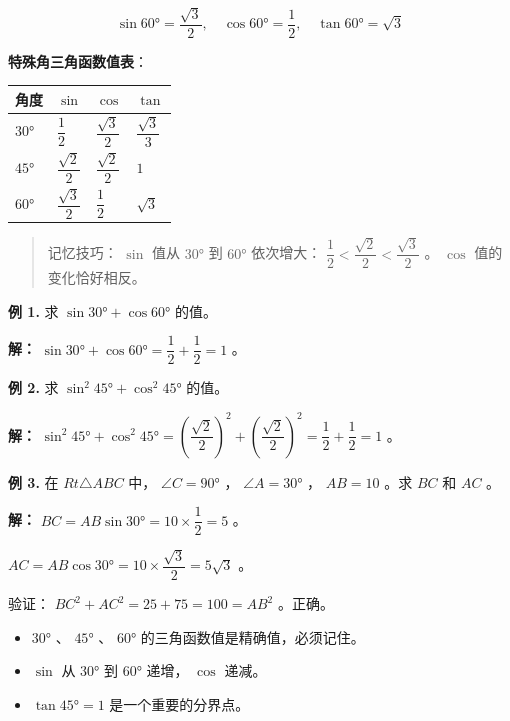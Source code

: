\begin{understand}
\[
\sin 60° = \frac{\sqrt{3}}{2}, \quad \cos 60° = \frac{1}{2}, \quad \tan 60° = \sqrt{3}
\]


\textbf{特殊角三角函数值表}：

\begin{center}
\begin{tabular}{llll}
\toprule
角度 & $\sin$ & $\cos$ & $\tan$ \\
\midrule
$30°$ & $\dfrac{1}{2}$ & $\dfrac{\sqrt{3}}{2}$ & $\dfrac{\sqrt{3}}{3}$ \\
$45°$ & $\dfrac{\sqrt{2}}{2}$ & $\dfrac{\sqrt{2}}{2}$ & $1$ \\
$60°$ & $\dfrac{\sqrt{3}}{2}$ & $\dfrac{1}{2}$ & $\sqrt{3}$ \\
\bottomrule
\end{tabular}
\end{center}


\end{understand}

\begin{quote}
记忆技巧： $\sin$ 值从 $30°$ 到 $60°$ 依次增大： $\dfrac{1}{2} < \dfrac{\sqrt{2}}{2} < \dfrac{\sqrt{3}}{2}$ 。 $\cos$ 值的变化恰好相反。
\end{quote}


\begin{workedexamples}


\textbf{例 1.} 求 $\sin 30° + \cos 60°$ 的值。

\textbf{解：}
$\sin 30° + \cos 60° = \dfrac{1}{2} + \dfrac{1}{2} = 1$ 。

\textbf{例 2.} 求 $\sin^2 45° + \cos^2 45°$ 的值。

\textbf{解：}
$\sin^2 45° + \cos^2 45° = \left(\dfrac{\sqrt{2}}{2}\right)^2 + \left(\dfrac{\sqrt{2}}{2}\right)^2 = \dfrac{1}{2} + \dfrac{1}{2} = 1$ 。

\textbf{例 3.} 在 $Rt\triangle ABC$ 中， $\angle C = 90°$ ， $\angle A = 30°$ ， $AB = 10$ 。求 $BC$ 和 $AC$ 。

\textbf{解：}
$BC = AB \sin 30° = 10 \times \dfrac{1}{2} = 5$ 。

$AC = AB \cos 30° = 10 \times \dfrac{\sqrt{3}}{2} = 5\sqrt{3}$ 。

验证： $BC^2 + AC^2 = 25 + 75 = 100 = AB^2$ 。正确。

\end{workedexamples}

\begin{keytakeaway}


\begin{itemize}
  \item $30°$ 、 $45°$ 、 $60°$ 的三角函数值是精确值，必须记住。
  \item $\sin$ 从 $30°$ 到 $60°$ 递增， $\cos$ 递减。
  \item $\tan 45° = 1$ 是一个重要的分界点。
\end{itemize}


\end{keytakeaway}

